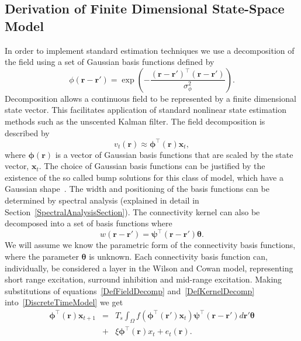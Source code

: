 \documentclass[12pt]{iopart}
\begin{document}
\subsection{Derivation of Finite Dimensional State-Space Model} 
In order to implement standard estimation techniques we use a decomposition of the field using a set of Gaussian basis functions defined by
\begin{equation}\label{eq:FieldBasisFunction}
	\phi\left(\mathbf{r}-\mathbf{r}'\right) =
\exp{\left(-\frac{(\mathbf{r}-\mathbf{r}')^\top(\mathbf{r}-\mathbf{r}')}{\sigma_{\phi}^2}\right)}. 
\end{equation}
 Decomposition allows a continuous field to be represented by a finite dimensional state vector. This facilitates application of standard nonlinear state estimation methods such as the unscented Kalman filter. The field decomposition is described by 
\begin{equation}
	\label{DefFieldDecomp} v_t\left(\mathbf{r}\right) \approx \boldsymbol{\phi}^{\top}\left(\mathbf{r}\right) \mathbf{x}_t, 
\end{equation}
where $\mathbf{\boldsymbol{\phi}}(\mathbf{r})$ is a vector of Gaussian basis functions that are scaled by the state vector, $\mathbf{x}_t$. The choice of Gaussian basis functions can be justified by the existence of the so called bump solutions for this class of model, which have a Gaussian shape~\cite{Coombes2005}. The width and positioning of the basis functions can be determined by spectral analysis (explained in detail in Section~\ref{SpectralAnalysisSection}). The connectivity kernel can also be decomposed into a set of basis functions where 
\begin{equation}\label{DefKernelDecomp}
	 w\left(\mathbf{r}-\mathbf{r}'\right) =\boldsymbol{\psi}^\top\left(\mathbf{r}-\mathbf{r}'\right) \boldsymbol{\theta}.
\end{equation}
We will assume we know the parametric form of the connectivity basis functions, where the parameter $\boldsymbol{\theta}$ is unknown. Each connectivity basis function can, individually, be considered a layer in the Wilson and Cowan model, representing short range excitation, surround inhibition and mid-range excitation. Making substitutions of equations~\ref{DefFieldDecomp} and~\ref{DefKernelDecomp} into~\ref{DiscreteTimeModel} we get 
\begin{eqnarray}
	\label{reduced continuous model}\boldsymbol{\phi}^{\top}(\mathbf{r})\mathbf{x}_{t+1}&=& T_s\int_\Omega{f(\boldsymbol{\phi}^{\top}(\mathbf{r}')\mathbf{x}_t )\boldsymbol{\psi}^{\top}(\mathbf{r}-\mathbf{r}')d\mathbf{r}'}\boldsymbol{\theta}\nonumber \\ 
	&+& \xi\boldsymbol{\phi}^{\top}(\mathbf{r})x_t + e_t(\mathbf{r}). 
\end{eqnarray}
\end{document}
